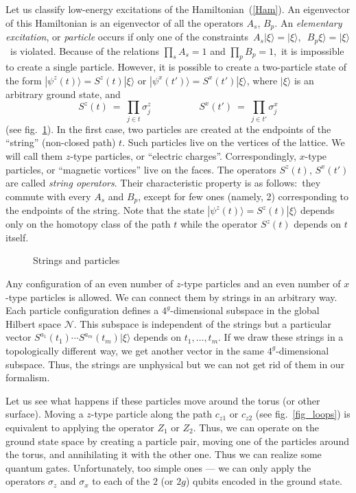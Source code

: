 \documentclass[12pt]{article}
\newcommand*{\epsfscale}[1]{\def\epsfsize##1##2{#1##1}}
\newcommand{\calN}{\mathcal{N}}
\begin{document}
Let us classify low-energy excitations of the Hamiltonian~(\ref{Ham}). An 
eigenvector of this Hamiltonian is an eigenvector of all the operators 
$A_s$, $B_p$. An \emph{elementary excitation}, or \emph{particle} occurs  if 
only one of the constraints\, $A_s|\xi\rangle=|\xi\rangle$,\,\, 
$B_p\xi\rangle=|\xi\rangle$\, is violated. Because of the relations 
$\prod_s A_s=1$ and $\prod_p B_p=1$,\, it is impossible to create a single 
particle. However, it is possible to create a two-particle state of the form
$|\psi^z(t)\rangle=S^z(t)|\xi\rangle$ 
or $|\psi^x(t')\rangle=S^x(t')|\xi\rangle$, 
where $|\xi\rangle$ is an arbitrary ground state, and
\begin{equation} \label{stringop}
  S^z(t)\ =\ \prod_{j\in t}\sigma^z_j \qquad\qquad\quad 
  S^x(t')\ =\ \prod_{j\in t'}\sigma^x_j
\end{equation}
(see fig.~\ref{fig_strings}). In the first case, two particles are created at 
the endpoints of the ``string'' (non-closed path) $t$. Such particles live on 
the vertices of the lattice. We will call them $z$-type particles, or 
``electric charges''. Correspondingly, $x$-type particles, or 
``magnetic vortices'' live on the faces. The operators $S^z(t)$, 
$S^x(t')$ are called \emph{string operators}. Their characteristic property is 
as follows:\, they commute with every $A_s$ and $B_p$, except for few ones 
(namely, 2) corresponding to the endpoints of the string. Note that the state 
$|\psi^z(t)\rangle=S^z(t)|\xi\rangle$ depends only on the homotopy class of 
the path $t$ while the operator $S^z(t)$ depends on $t$ itself.

\begin{figure}[t]
\centerline{\epsfscale{0.6}}
\caption{Strings and particles}
\label{fig_strings}
\end{figure}

Any configuration of an even number of $z$-type particles and an even number 
of $x$-type particles is allowed. We can connect them by strings in an 
arbitrary way. Each particle configuration defines a $4^g$-dimensional 
subspace in the global Hilbert space $\calN$. This subspace is independent of 
the strings but a particular vector 
$S^{a_1}(t_1)\cdots S^{a_m}(t_m)|\xi\rangle$ depends on $t_1,\ldots,t_m$. 
If we draw these strings in a topologically different way, we get another 
vector in the same $4^g$-dimensional subspace. Thus, the strings are 
unphysical but we can not get rid of them in our formalism. 

Let us see what happens if these particles move around the torus (or other
surface). Moving a $z$-type particle along the path $c_{z1}$ or $c_{z2}$ 
(see fig.~\ref{fig_loops}) is equivalent to applying the operator $Z_1$ or 
$Z_2$. Thus, we can operate on the ground state space by creating a particle
pair, moving one of the particles around the torus, and annihilating it with 
the other one. Thus we can realize some quantum gates. Unfortunately, 
too simple ones --- we can only apply the operators $\sigma_z$ and $\sigma_x$ 
to each of the $2$ (or $2g$) qubits encoded in the ground state.
\end{document}
